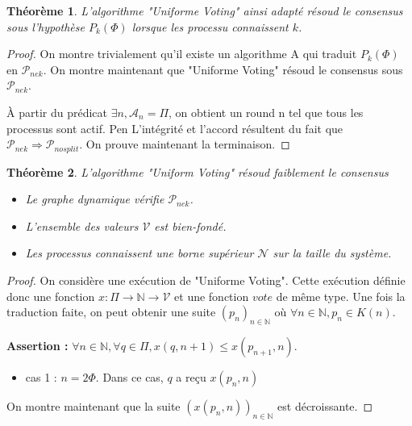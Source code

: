\documentclass{article}
\newtheorem{theorem}{Théorème}
\begin{document}
\begin{theorem}
	L'algorithme "Uniforme Voting" ainsi adapté résoud le consensus sous l'hypothèse $P_k(\Phi)$ lorsque les processu connaissent $k$.
\end{theorem}
\begin{proof}
	On montre trivialement qu'il existe un algorithme A qui traduit $P_k(\Phi)$ en $\mathcal{P}_{nek}$. On montre maintenant que "Uniforme Voting" résoud le consensus sous $\mathcal{P}_{nek}$.

	À partir du prédicat $\exists n, \mathcal{A}_n = \Pi$, on obtient un round n tel que tous les processus sont actif.
	Pen
	L'intégrité et l'accord résultent du fait que $\mathcal{P}_{nek} \Rightarrow \mathcal{P}_{nosplit}$. On prouve maintenant la terminaison.
\end{proof}

\begin{theorem}

	L'algorithme "Uniform Voting" résoud faiblement le consensus 

	\begin{itemize}

	\item Le graphe dynamique vérifie $\mathcal{P}_{nek}$.
	\item L'ensemble des valeurs $\mathcal{V}$ est bien-fondé.
	\item Les processus connaissent une borne supérieur $\mathcal{N}$ sur la taille du système.

	\end{itemize}
\end{theorem}

\begin{proof}

	On considère une exécution de "Uniforme Voting". Cette exécution définie donc
	une fonction $x : \Pi \rightarrow \mathds{N} \rightarrow \mathcal{V}$ et une fonction $vote$ de même type.
	Une fois la traduction faite, on peut obtenir une suite $(p_n)_{n \in \mathds{N}}$ où $\forall n \in \mathds{N}, p_n \in K(n)$.

	\textbf{Assertion :} $\forall n \in \mathds{N}, \forall q \in \Pi, x(q,n+1) \leq x(p_{n+1},n)$.
	\begin{itemize}

	\item cas 1 : $n = 2 \Phi$. Dans ce cas, $q$ a reçu $x(p_n,n)$ 

	\end{itemize}

	On montre maintenant que la suite $(x(p_n, n))_{n \in \mathds{N}}$ est décroissante.
\end{proof}
\end{document}
